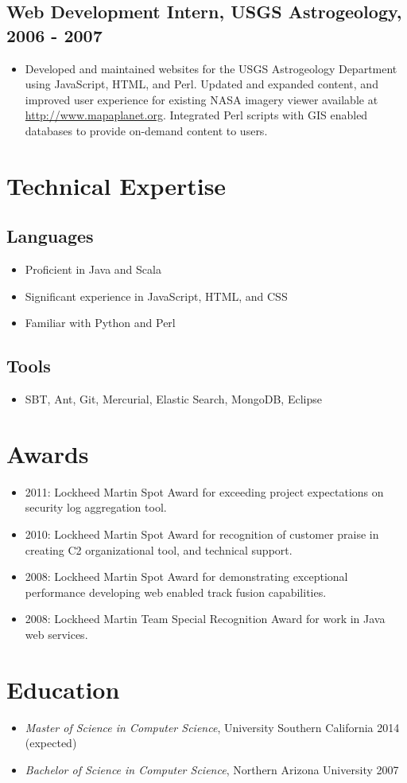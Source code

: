 \documentclass[11pt]{article}
\begin{document}
\subsection*{Web Development Intern, USGS Astrogeology, 2006 - 2007}
\label{sec-1.3}

\begin{itemize}
\item Developed and maintained websites for the USGS Astrogeology Department using JavaScript, HTML, and Perl. Updated and expanded content, and improved user experience for existing NASA imagery viewer available at \href{http://www.mapaplanet.org}{http://www.mapaplanet.org}. Integrated Perl scripts with GIS enabled databases to provide on-demand content to users.
\end{itemize}
\section*{Technical Expertise}
\label{sec-2}

\subsection*{Languages}
\label{sec-2.1}

\begin{itemize}
\item Proficient in Java and Scala
\item Significant experience in JavaScript, HTML, and CSS
\item Familiar with Python and Perl
\end{itemize}
\subsection*{Tools}
\label{sec-2.2}

\begin{itemize}
\item SBT, Ant, Git, Mercurial, Elastic Search, MongoDB, Eclipse
\end{itemize}
\section*{Awards}
\label{sec-3}

\begin{itemize}
\item 2011: Lockheed Martin Spot Award for exceeding project expectations on security log aggregation tool.
\item 2010: Lockheed Martin Spot Award for recognition of customer praise in creating C2 organizational tool, and technical support.
\item 2008: Lockheed Martin Spot Award for demonstrating exceptional performance developing web enabled track fusion capabilities.
\item 2008: Lockheed Martin Team Special Recognition Award for work in Java web services.
\end{itemize}
\section*{Education}
\label{sec-4}

\begin{itemize}
\item \emph{Master of Science in Computer Science}, University Southern California 2014 (expected)
\item \emph{Bachelor of Science in Computer Science}, Northern Arizona University 2007
\end{itemize}
\end{document}
